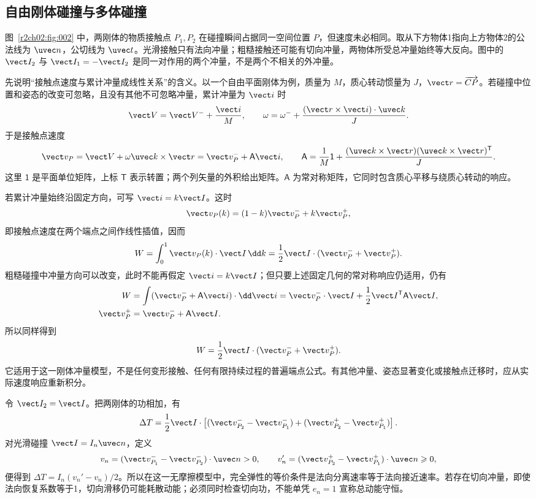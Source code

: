 \subsection{自由刚体碰撞与多体碰撞}
\label{r2ch02:sec:rigid-collision}

图~\ref{r2ch02:fig:002} 中，两刚体的物质接触点 $P_1,P_2$ 在碰撞瞬间占据同一空间位置 $P$，但速度未必相同。取从下方物体1指向上方物体2的公法线为 $\uvec n$，公切线为 $\uvec t$。光滑接触只有法向冲量；粗糙接触还可能有切向冲量，两物体所受总冲量始终等大反向。图中的 $\vect I_2$ 与 $\vect I_1=-\vect I_2$ 是同一对作用的两个冲量，不是两个不相关的外冲量。
\figRigidImpact

先说明“接触点速度与累计冲量成线性关系”的含义。以一个自由平面刚体为例，质量为 $M$，质心转动惯量为 $J$，$\vect r=\overrightarrow{CP}$。若碰撞中位置和姿态的改变可忽略，且没有其他不可忽略冲量，累计冲量为 $\vect i$ 时
\[
 \vect V=\vect V^-+\frac{\vect i}{M},\qquad
 \omega=\omega^-+\frac{(\vect r\times\vect i)\cdot\uvec k}{J}.
\]
于是接触点速度
\[
 \vect v_P=\vect V+\omega\uvec k\times\vect r
          =\vect v_P^-+\mathsf A\vect i,\qquad
 \mathsf A=\frac1M\mathsf 1+
 \frac{(\uvec k\times\vect r)(\uvec k\times\vect r)^{\mathsf T}}J.
\]
这里 $\mathsf 1$ 是平面单位矩阵，上标 $\mathsf T$ 表示转置；两个列矢量的外积给出矩阵。$\mathsf A$ 为常对称矩阵，它同时包含质心平移与绕质心转动的响应。

若累计冲量始终沿固定方向，可写 $\vect i=k\vect I$。这时
\[
 \vect v_P(k)=(1-k)\vect v_P^-+k\vect v_P^+,
\]
即接触点速度在两个端点之间作线性插值，因而
\[
 W=\int_0^1\vect v_P(k)\cdot\vect I\,\dd k
   =\frac12\vect I\cdot(\vect v_P^-+\vect v_P^+).
\]
粗糙碰撞中冲量方向可以改变，此时不能再假定 $\vect i=k\vect I$；但只要上述固定几何的常对称响应仍适用，仍有
\[
\begin{aligned}
 W&=\int(\vect v_P^-+\mathsf A\vect i)\cdot\dd\vect i
   =\vect v_P^-\cdot\vect I+\frac12\vect I^{\mathsf T}\mathsf A\vect I,\\
 \vect v_P^+&=\vect v_P^-+\mathsf A\vect I.
\end{aligned}
\]
所以同样得到
\begin{equation}
 W=\frac12\vect I\cdot(\vect v_P^-+\vect v_P^+).
 \label{r2ch02:eq:028}
\end{equation}
它适用于这一刚体冲量模型，不是任何变形接触、任何有限持续过程的普遍端点公式。有其他冲量、姿态显著变化或接触点迁移时，应从实际速度响应重新积分。

令 $\vect I_2=\vect I$。把两刚体的功相加，有
\[
 \Delta T=\frac12\vect I\cdot
 \left[(\vect v_{P_2}^--\vect v_{P_1}^-)
       +(\vect v_{P_2}^+-\vect v_{P_1}^+)\right].
\]
对光滑碰撞 $\vect I=I_n\uvec n$，定义
\[
 v_n=(\vect v_{P_1}^--\vect v_{P_2}^-)\cdot\uvec n>0,
 \qquad
 v_n'=(\vect v_{P_2}^+-\vect v_{P_1}^+)\cdot\uvec n\geqslant0,
\]
便得到 $\Delta T=I_n(v_n'-v_n)/2$。所以在这一无摩擦模型中，完全弹性的等价条件是法向分离速率等于法向接近速率。若存在切向冲量，即使法向恢复系数等于1，切向滑移仍可能耗散动能；必须同时检查切向功，不能单凭 $e_n=1$ 宣称总动能守恒。

